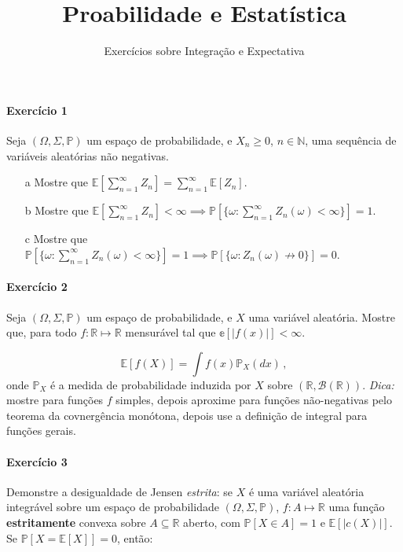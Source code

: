 \documentclass[10pt,a4paper]{article}
\title{\large Proabilidade e Estatística}
\author{\normalsize Exercícios sobre Integração e Expectativa}
\date{}
\begin{document}
	\maketitle
	\paragraph{Exercício 1} Seja $(\Omega, \Sigma, \mathbb{P})$ um espaço de probabilidade, e $X_n\geq0$, $n \in \mathbb{N}$, uma sequência de variáveis aleatórias não negativas.
	
	\begin{itemize}
		\item[a] Mostre que $\mathbb{E}[\sum_{n=1}^\infty Z_n] = \sum_{n=1}^\infty \mathbb{E}[Z_n]$.
		\item[b] Mostre que $\mathbb{E}[\sum_{n=1}^\infty Z_n] < \infty \implies \mathbb{P}[\{\omega:\sum_{n=1}^\infty Z_n(\omega) <\infty \}] = 1$.
		\item[c] Mostre que $\mathbb{P}[\{\omega:\sum_{n=1}^\infty Z_n(\omega) <\infty \}] = 1 \implies \mathbb{P}[\{\omega: Z_n(\omega)\nrightarrow 0\}] = 0$.
\end{itemize}

\paragraph{Exercício 2} Seja $(\Omega, \Sigma,\mathbb{P})$ um espaço de probabilidade, e $X$ uma variável aleatória. Mostre que, para todo $f: \mathbb{R} \mapsto \mathbb{R}$ mensurável tal que $\mathbb{e}[|f(x)|]<\infty$.

$$\mathbb{E}[f(X)] = \int f(x) \mathbb{P}_X(dx)\,, $$
onde $\mathbb{P}_X$ é a medida de probabilidade induzida por $X$ sobre $(\mathbb{R}, \mathcal{B}(\mathbb{R}))$. \textit{Dica:} mostre para funções $f$ simples, depois aproxime para funções não-negativas pelo teorema da covnergência monótona, depois use a definição de integral para funções gerais.

\paragraph{Exercício 3} Demonstre a desigualdade de Jensen \emph{estrita}: se $X$ é uma variável aleatória integrável sobre um espaço de probabilidade $(\Omega,\Sigma,\mathbb{P})$, $f: A \mapsto \mathbb{R}$ uma função \textbf{estritamente} convexa sobre $A \subseteq \mathbb{R}$ aberto, com $\mathbb{P}[X\in A] = 1$ e $\mathbb{E}[|c(X)|]$. Se $\mathbb{P}[X = \mathbb{E}[X]] = 0$, então:
\end{document}
